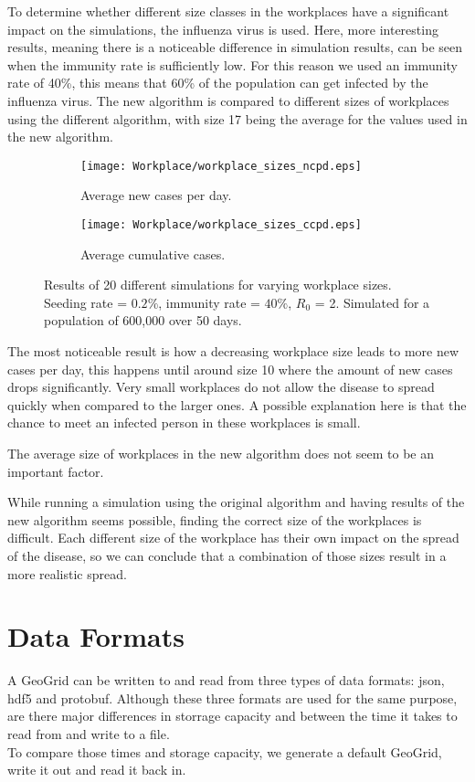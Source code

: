 \documentclass[runningheads]{llncs}
\begin{document}
To determine whether different size classes in the workplaces have a significant impact on the simulations, the influenza virus is used.
Here, more interesting results, meaning there is a noticeable difference in simulation results, can be seen when the immunity rate is sufficiently low. For this reason we used an immunity rate of 40\%, this means that 60\% of the population can get infected by the influenza virus.
The new algorithm is compared to different sizes of workplaces using the different algorithm, with size 17 being the average for the values used in the new algorithm.

\begin{figure}[h!]
	\centering
	\begin{subfigure}[b]{0.6\linewidth}
		\texttt{[image: Workplace/workplace\_sizes\_ncpd.eps]}
		\caption{Average new cases per day.}
	\end{subfigure}
	\begin{subfigure}[b]{0.6\linewidth}
		\texttt{[image: Workplace/workplace\_sizes\_ccpd.eps]}
		\caption{Average cumulative cases.}
	\end{subfigure}
	\caption{Results of 20 different simulations for varying workplace sizes. Seeding rate = $0.2\%$, immunity rate = $40\%$, $R_0$ = 2. Simulated for a population of 600,000 over 50 days.}
	\label{workplace_immunity}
\end{figure}

The most noticeable result is how a decreasing workplace size leads to more new cases per day, this happens until around size 10 where the amount of new cases drops significantly. Very small workplaces do not allow the disease to spread quickly when compared to the larger ones. A possible explanation here is that the chance to meet an infected person in these workplaces is small.

The average size of workplaces in the new algorithm does not seem to be an important factor.

While running a simulation using the original algorithm and having results of the new algorithm seems possible, finding the correct size of the workplaces is difficult. Each different size of the workplace has their own impact on the spread of the disease, so we can conclude that a combination of those sizes result in a more realistic spread.

\newpage
\section{Data Formats}
A GeoGrid can be written to and read from three types of data formats: json, hdf5 and protobuf. Although these three formats are used for the same purpose, are there major differences in storrage capacity and between the time it takes to read from and write to a file. \\
To compare those times and storage capacity, we generate a default GeoGrid, write it out and read it back in. 
\end{document}
